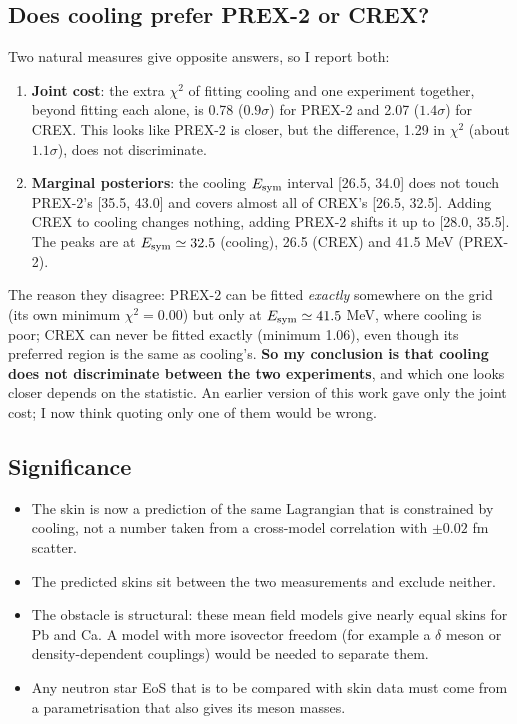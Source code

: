 \documentclass[11pt,a4paper]{article}
\newcommand{\Esym}{E_{\rm sym}}
\begin{document}
\subsection{Does cooling prefer PREX-2 or CREX?}
Two natural measures give opposite answers, so I report both:
\begin{enumerate}
\item \textbf{Joint cost}: the extra $\chi^2$ of fitting cooling and one experiment together, beyond fitting each alone, is 0.78 ($0.9\sigma$) for PREX-2 and 2.07 ($1.4\sigma$) for CREX. This looks like PREX-2 is closer, but the difference, 1.29 in $\chi^2$ (about $1.1\sigma$), does not discriminate.
\item \textbf{Marginal posteriors}: the cooling $\Esym$ interval [26.5, 34.0] does not touch PREX-2's [35.5, 43.0] and covers almost all of CREX's [26.5, 32.5]. Adding CREX to cooling changes nothing, adding PREX-2 shifts it up to [28.0, 35.5]. The peaks are at $\Esym\simeq32.5$ (cooling), 26.5 (CREX) and 41.5 MeV (PREX-2).
\end{enumerate}
The reason they disagree: PREX-2 can be fitted \emph{exactly} somewhere on the grid (its own minimum $\chi^2=0.00$) but only at $\Esym\simeq41.5$ MeV, where cooling is poor; CREX can never be fitted exactly (minimum 1.06), even though its preferred region is the same as cooling's. \textbf{So my conclusion is that cooling does not discriminate between the two experiments}, and which one looks closer depends on the statistic. An earlier version of this work gave only the joint cost; I now think quoting only one of them would be wrong.

\subsection{Significance}
\begin{itemize}
\item The skin is now a prediction of the same Lagrangian that is constrained by cooling, not a number taken from a cross-model correlation with $\pm0.02$ fm scatter.
\item The predicted skins sit between the two measurements and exclude neither.
\item The obstacle is structural: these mean field models give nearly equal skins for Pb and Ca. A model with more isovector freedom (for example a $\delta$ meson or density-dependent couplings) would be needed to separate them.
\item Any neutron star EoS that is to be compared with skin data must come from a parametrisation that also gives its meson masses.
\end{itemize}
\end{document}
